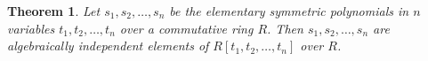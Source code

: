 \documentclass[12pt]{article}
\newtheorem*{theorem}{Theorem}
\begin{document}
\begin{theorem}
Let $s_1, s_2, \dots, s_n$ be the elementary symmetric polynomials in $n$ variables $t_1, t_2, \dots, t_n$ over a commutative ring $R$.
Then $s_1, s_2, \dots, s_n$ are algebraically independent elements of 
$R[t_1, t_2, \dots, t_n]$ over $R$.
\end{theorem}
\end{document}
